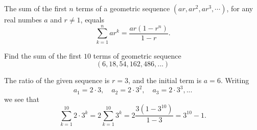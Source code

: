 \documentclass[nooutcomes]{ximera}
\begin{document}
\begin{callout}
  The sum of the first $n$ terms of a geometric sequence $(ar,ar^2,ar^3,\cdots)$, for any real numbes $a$ and $r\neq 1$, equals $$\sum_{k=1}^n ar^k = \frac{ar(1-r^n)}{1-r}.$$
\end{callout}

\begin{example}
  Find the sum of the first $10$ terms of geometric sequence $$(6,18,54,162,486,...)$$

  \begin{explanation}
   The ratio of the given sequence is $r=3$, and the initial term is $a=6$. Writing $$a_1 = 2\cdot 3, \quad a_2 = 2\cdot 3^2,\quad a_3 = 2\cdot 3^3,...$$we see that $$\sum_{k=1}^{10}2\cdot 3^k = 2\sum_{k=1}^{10} 3^k = 2\frac{3(1-3^{10})}{1-3} = 3^{10}-1.$$ 
  \end{explanation}
  
\end{example}
\end{document}
